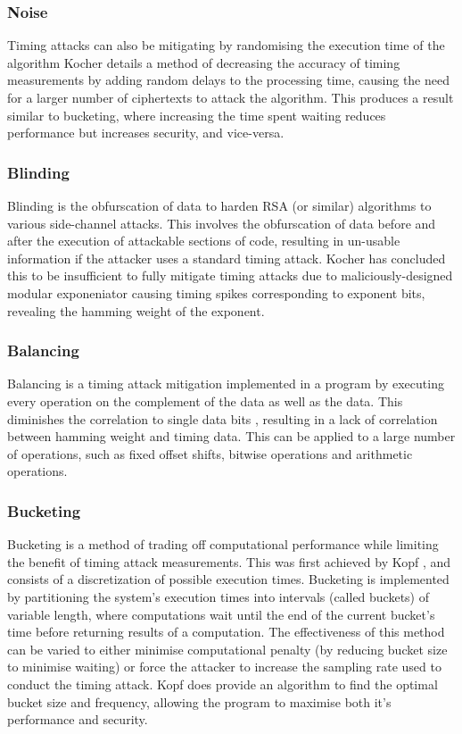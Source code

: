 \documentclass[british,11pt,a4paper]{article}
\begin{document}
\subsubsection{Noise}
Timing attacks can also be mitigating by randomising the execution time of the algorithm
Kocher \cite{kocher96timing} details a method of decreasing the accuracy of timing measurements
by adding random delays to the processing time, causing the need for a larger number of ciphertexts to attack
the algorithm. This produces a result similar to bucketing, where increasing the time spent waiting reduces performance but increases security, and vice-versa.

\subsubsection{Blinding}
Blinding is the obfurscation of data to harden RSA (or similar) algorithms to various side-channel attacks.
This involves the obfurscation of data before and after the execution of attackable sections of code,
resulting in un-usable information if the attacker uses a standard timing attack.
Kocher \cite{kocher96timing} has concluded this to be insufficient to fully mitigate timing attacks due to maliciously-designed modular exponeniator
causing timing spikes corresponding to exponent bits, revealing the hamming weight of the exponent.

\subsubsection{Balancing}
Balancing is a timing attack mitigation implemented in a program by executing every operation on the complement of the data as well as the data.
This diminishes the correlation to single data bits \cite{daemen-implementattacks}, resulting in a lack of correlation between hamming weight and timing data. This can be applied to a
large number of operations, such as fixed offset shifts, bitwise operations and arithmetic operations.
\subsubsection{Bucketing}
Bucketing is a method of trading off computational performance while limiting the benefit of timing attack measurements.
This was first achieved by Kopf \cite{Kopf2009-mh}, and consists of a discretization of possible execution times.
Bucketing is implemented by partitioning the system's execution times into intervals (called buckets) of variable length,
where computations wait until the end of the current bucket's time before returning results of a computation. The effectiveness of this method
can be varied to either minimise computational penalty (by reducing bucket size to minimise waiting) or force the attacker to increase the sampling rate used to conduct the timing attack.
Kopf does provide an algorithm to find the optimal bucket size and frequency, allowing the program to maximise both it's performance and security.
\end{document}
